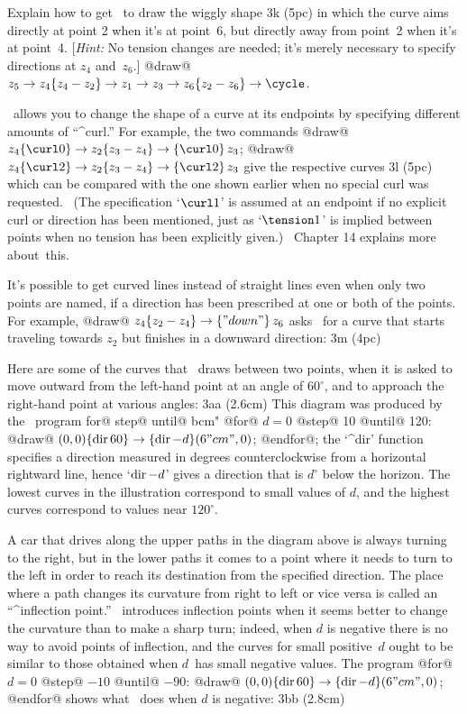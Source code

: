 \exercise Explain how to get \MF\ to draw the wiggly shape
\displayfig 3k (5pc)
in which the curve aims directly at point 2 when it's at point~6, but
directly away from point~2 when it's at point~4. [{\sl Hint:\/} No
tension changes are needed; it's merely necessary to specify directions
at $z_4$ and~$z_6$.]
\answer @draw@ $z_5\to z_4\{z_4-z_2\}\to z_1\to z_3\to z_6\{z_2-z_6\}
\to\cycle$.

\MF\ allows you to change the shape of a curve at its endpoints by
specifying different amounts of ``^{curl}.'' For example, the two commands
\begindisplay
@draw@ $z_4\{\curl0\}\to z_2\{z_3-z_4\}\to\{\curl0\}\,z_3$;\cr
@draw@ $z_4\{\curl2\}\to z_2\{z_3-z_4\}\to\{\curl2\}\,z_3$\cr
\enddisplay
give the respective curves
\displayfig 3l (5pc)
which can be compared with the one shown earlier when no special curl was
requested. \ (The specification `$\curl1$' is assumed at an endpoint
if no explicit curl or direction has been mentioned, just as
`$\tension1$' is implied between points when no tension has
been explicitly given.) \ Chapter 14 explains more about~this.

It's possible to get curved lines instead of straight lines even when
only two points are named, if a direction has been prescribed at one or
both of the points. For example,
\begindisplay
@draw@ $z_4\{z_2-z_4\}\to\{"down"\}\,z_6$\cr
\enddisplay
asks \MF\ for a curve that starts traveling towards $z_2$ but finishes
in a downward direction:
\displayfig 3m (4pc)

\danger Here are some of the curves that \MF\ draws between two points, when
it is asked to move outward from the left-hand point at an angle of
$60^\circ$, and to approach the right-hand point at various angles:
\displayfig 3aa (2.6cm)
This diagram was produced by the \MF\ program ^^@for@ ^^@step@ ^^@until@ ^^"cm"
\begindisplay
@for@ $d=0$ @step@ 10 @until@ 120:\cr
\indent @draw@ $(0,0)\{{\rm dir}\,60\}\to\{{\rm dir}\,{-d}\}(6"cm",0)$;
 @endfor@;\cr
\enddisplay
the `^{dir}' function specifies a direction measured in degrees
counterclockwise from a horizontal rightward line, hence `${\rm dir}\,{-d}$'
gives a direction that is $d^\circ$ below the horizon.  The lowest curves
in the illustration correspond to small values of $d$, and the highest
curves correspond to values near $120^\circ$.

\danger A car that drives along the upper paths in the diagram above
is always turning to the right, but in the lower paths it comes to a
point where it needs to turn to the left in order to reach its destination
from the specified direction.
The place where a path changes its curvature from right to left or
vice versa is called an ``^{inflection point}.'' \MF\ introduces
inflection points when it seems better to change the curvature than
to make a sharp turn; indeed, when $d$ is negative there is no way to
avoid points of inflection, and the curves for small positive~$d$ ought to
be similar to those obtained when $d$~has small negative values. The program
\begindisplay
@for@ $d=0$ @step@ $-10$ @until@ $-90$:\cr
\indent @draw@ $(0,0)\{{\rm dir}\,60\}\to\{{\rm dir}\,{-d}\}(6"cm",0)$;
 @endfor@\cr
\enddisplay
shows what \MF\ does when $d$ is negative:
\displayfig 3bb (2.8cm)


